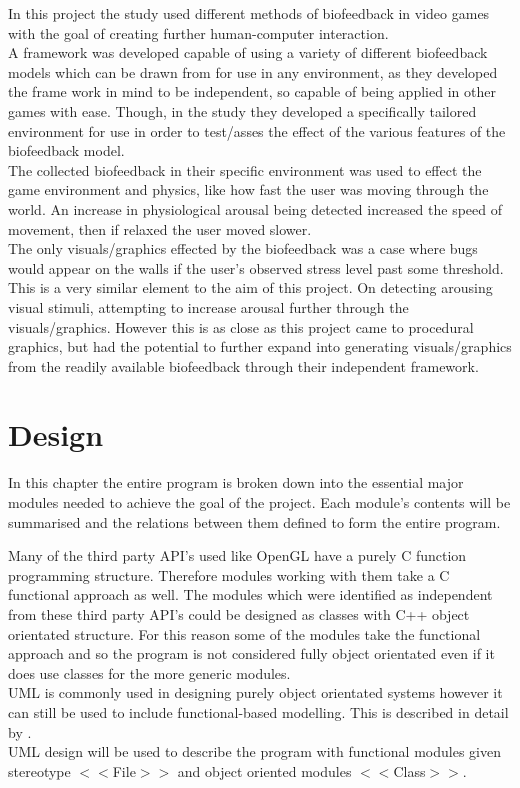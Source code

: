 \documentclass{report}
\begin{document}
In this project \citep{torres2013development} the study used different methods
of biofeedback in video games with the goal of creating further human-computer 
interaction.\\
A framework was developed capable of using a variety of different 
biofeedback models which can be drawn from for use in any environment, as 
they developed the frame work in mind to be independent, so capable of 
being applied in other games with ease. Though, in the study they developed 
a specifically tailored environment for use in order to test/asses the effect of 
the various features of the biofeedback model.\\
The collected biofeedback in their specific environment was used to effect the game environment and physics, like how fast the user was moving through the world.
An increase in physiological arousal being detected increased the speed of 
movement, then if relaxed the user moved slower.\\
The only visuals/graphics effected by the biofeedback was a case where bugs would appear on the walls if the user's observed stress level past some threshold.
This is a very similar element to the aim of this project. On detecting 
arousing visual stimuli, attempting to increase arousal further through the visuals/graphics. 
However this is as close as this project came to procedural graphics, but had the potential 
to further expand into generating visuals/graphics from the readily available
 biofeedback through their independent framework.
 
\chapter{Design}

In this chapter the entire program is broken down into the essential major modules needed to achieve the goal of the project. Each module's contents will be summarised
and the relations between them defined to form the entire program.

Many of the third party API's used like OpenGL have a purely C function programming structure. Therefore modules working with them take a C 
functional approach as well. The modules which were identified as independent from these third party API's could be designed as classes with C++ object orientated structure.
For this reason some of the modules take the functional approach and so the program is not considered fully object orientated even if it does use classes
for the more generic modules.\\
UML is commonly used in designing purely object orientated systems however it can still be used to include functional-based modelling. This is described in detail by \citep{UML2009C}.\\
UML design will be used to describe the program with functional modules given stereotype $<<$File$>>$ and object oriented modules $<<$Class$>>$.
\end{document}
